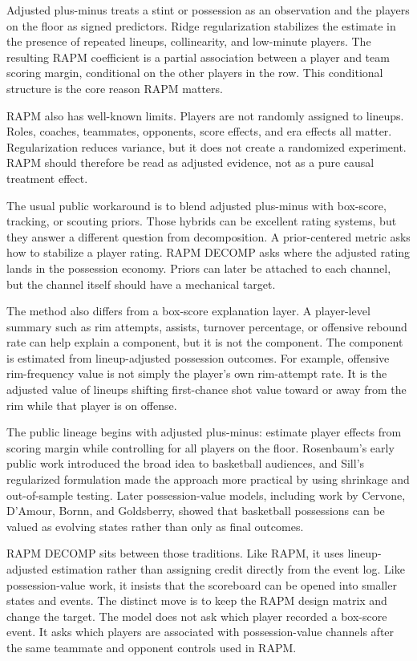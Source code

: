 \documentclass[11pt]{article}
\begin{document}
Adjusted plus-minus treats a stint or possession as an observation and the
players on the floor as signed predictors.  Ridge regularization stabilizes the
estimate in the presence of repeated lineups, collinearity, and low-minute
players.  The resulting RAPM coefficient is a partial association between a
player and team scoring margin, conditional on the other players in the row.
This conditional structure is the core reason RAPM matters.

RAPM also has well-known limits.  Players are not randomly assigned to lineups.
Roles, coaches, teammates, opponents, score effects, and era effects all matter.
Regularization reduces variance, but it does not create a randomized
experiment.  RAPM should therefore be read as adjusted evidence, not as a pure
causal treatment effect.

The usual public workaround is to blend adjusted plus-minus with box-score,
tracking, or scouting priors.  Those hybrids can be excellent rating systems,
but they answer a different question from decomposition.  A prior-centered
metric asks how to stabilize a player rating.  RAPM DECOMP asks where the
adjusted rating lands in the possession economy.  Priors can later be attached
to each channel, but the channel itself should have a mechanical target.

The method also differs from a box-score explanation layer.  A player-level
summary such as rim attempts, assists, turnover percentage, or offensive
rebound rate can help explain a component, but it is not the component.  The
component is estimated from lineup-adjusted possession outcomes.  For example,
offensive rim-frequency value is not simply the player's own rim-attempt rate.
It is the adjusted value of lineups shifting first-chance shot value toward or
away from the rim while that player is on offense.

The public lineage begins with adjusted plus-minus: estimate player effects
from scoring margin while controlling for all players on the floor.  Rosenbaum's
early public work introduced the broad idea to basketball audiences, and Sill's
regularized formulation made the approach more practical by using shrinkage and
out-of-sample testing.  Later possession-value models, including work by
Cervone, D'Amour, Bornn, and Goldsberry, showed that basketball possessions can
be valued as evolving states rather than only as final outcomes.

RAPM DECOMP sits between those traditions.  Like RAPM, it uses lineup-adjusted
estimation rather than assigning credit directly from the event log.  Like
possession-value work, it insists that the scoreboard can be opened into
smaller states and events.  The distinct move is to keep the RAPM design matrix
and change the target.  The model does not ask which player recorded a
box-score event.  It asks which players are associated with possession-value
channels after the same teammate and opponent controls used in RAPM.
\end{document}
